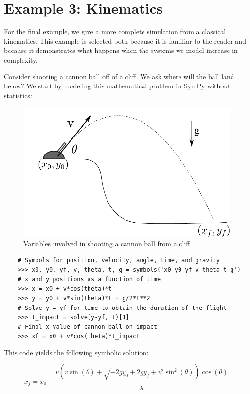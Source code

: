 \section{Example 3: Kinematics}

For the final example, we give a more complete simulation from a classical
kinematics.  This example is selected both because it is familiar to the reader and because it demonstrates what happens when the systems we model increase in complexity.  

Consider shooting a cannon ball off of a cliff. We ask where will the ball land below?
We start by modeling this mathematical problem in SymPy without statistics:

\begin{figure}[ht]
\vspace{-0pt}
\centering
\includegraphics[width=.55\textwidth]{images/kinematics}
\vspace{-0pt}
\caption{Variables involved in shooting a cannon ball from a cliff}
\label{fig:kinematics}
\vspace{00pt}
\end{figure}

\begin{lstlisting}
    # Symbols for position, velocity, angle, time, and gravity
    >>> x0, y0, yf, v, theta, t, g = symbols('x0 y0 yf v theta t g')
    # x and y positions as a function of time
    >>> x = x0 + v*cos(theta)*t
    >>> y = y0 + v*sin(theta)*t + g/2*t**2
    # Solve y = yf for time to obtain the duration of the flight
    >>> t_impact = solve(y-yf, t)[1]
    # Final x value of cannon ball on impact
    >>> xf = x0 + v*cos(theta)*t_impact
\end{lstlisting}
This code yields the following symbolic solution:

\begin{equation}
\label{eqn:kinematics_symbolic}
x_f = x_{0} - \frac{v \left(v \sin{\left (\theta \right )} + \sqrt{- 2 g y_{0} + 2 g y_f + v^{2} \sin^{2}{\left (\theta \right )}}\right) \cos{\left (\theta \right )}}{g}
\end{equation}

